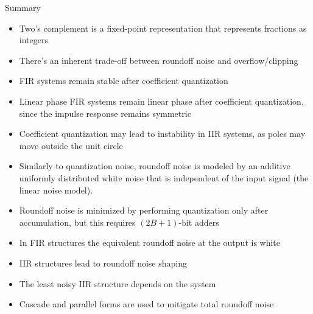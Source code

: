 \documentclass[10pt]{beamer}
\begin{document}
%
\begin{frame}{Summary}
\begin{itemize}
	\item Two's complement is a fixed-point representation that represents fractions as integers
	\item There's an inherent trade-off between roundoff noise and overflow/clipping
	\item FIR systems remain stable after coefficient quantization
	\item Linear phase FIR systems remain linear phase after coefficient quantization, since the impulse response remains symmetric
	\item Coefficient quantization may lead to instability in IIR systems, as poles may move outside the unit circle
	\item Similarly to quantization noise, roundoff noise is modeled by an additive uniformly distributed white noise that is independent of the input signal (the linear noise model).
	\item Roundoff noise is minimized by performing quantization only after accumulation, but this requires $(2B+1)$-bit adders
	\item In FIR structures the equivalent roundoff noise at the output is white
	\item IIR structures lead to roundoff noise shaping
	\item The least noisy IIR structure depends on the system
	\item Cascade and parallel forms are used to mitigate total roundoff noise
\end{itemize}
\end{frame}
\end{document}
